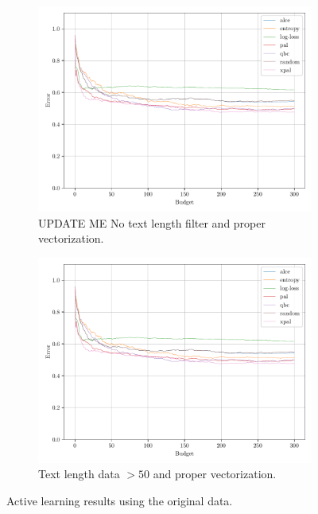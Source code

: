 \begin{figure}[h]
    \centering
    \begin{subfigure}{0.49\textwidth}
        \includegraphics[width=\textwidth]{../img/plot_text_data_original_proper_vectorizer_test_results.pdf}
        \caption{UPDATE ME No text length filter and proper vectorization.}
        \label{fig:probal_original_proper_vect}
    \end{subfigure}
    \hfill
    \begin{subfigure}{0.49\textwidth}
        \includegraphics[width=\textwidth]{../img/plot_text_data_original_proper_vectorizer_test_results.pdf}
        \caption{Text length data $>50$ and proper vectorization.}
        \label{fig:probal_original_proper_vect_50_st_filter}
    \end{subfigure}
    \caption{Active learning results using the original data.}
\end{figure}

